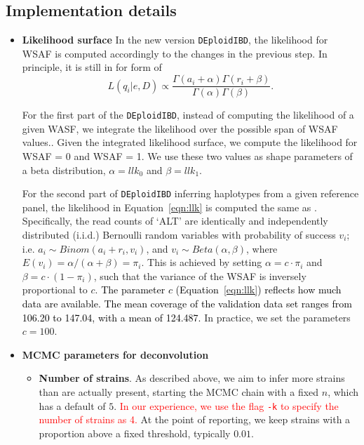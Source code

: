 \documentclass[9pt]{article}
\begin{document}
\subsection{Implementation details}
\begin{itemize}


\item {\bf Likelihood surface}
In the new version {\tt DEploidIBD}, the likelihood for WSAF is computed accordingly to the changes in the previous step. In principle, it is still in for form of
\begin{equation}
L(q_{i}| e, D) \propto \frac{\Gamma(a_i + \alpha) \Gamma(r_i + \beta)}{\Gamma(\alpha)\Gamma(\beta)}. \label{eqn:llk}
\end{equation}

For the first part of the {\tt DEploidIBD}, instead of computing the likelihood of a given WASF, we integrate the likelihood over the possible span of WSAF values.. Given the integrated likelihood surface, we compute the likelihood for WSAF = 0 and WSAF = 1. We use these two values as shape parameters of a beta distribution, $\alpha = llk_{0}$ and $\beta = llk_{1}$.

For the second part of {\tt DEploidIBD} inferring haplotypes from a given reference panel, the likelihood in Equation~\ref{eqn:llk} is computed the same as \cite{Zhu2017}. Specifically, the read counts of `ALT' are identically and independently distributed (i.i.d.) Bernoulli random variables with probability of success $v_i$; i.e. $a_i \sim Binom(a_i + r_i, v_i)$, and $v_i \sim Beta(\alpha, \beta)$, where $E(v_i) = \alpha/(\alpha+\beta) = \pi_{i}$. This is achieved by setting $\alpha = c\cdot \pi_{i} $ and $\beta = c\cdot (1-\pi_{i})$, such that the variance of the WSAF is inversely proportional to $c$. \textcolor{black}{The parameter $c$ (Equation~\eqref{eqn:llk}) reflects how much data are available. The mean coverage of the validation data set ranges from 106.20 to 147.04, with a mean of 124.487.} In practice, we set the parameters $c=100$.


\item {\bf MCMC parameters for deconvolution}

\begin{itemize}
\item {\bf Number of strains}. As described above, we aim to infer more strains than are actually present, starting the MCMC chain with a fixed $n$, which has a default of $5$. \textcolor{red}{In our experience, we use the flag {\tt -k} to specify the number of strains as 4.} At the point of reporting, we keep strains with a proportion above a fixed threshold, typically $0.01$.


\end{itemize}
\end{itemize}
\end{document}
